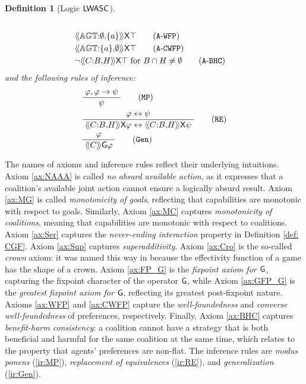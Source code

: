 \documentclass{article}
\newtheorem{definition}{Definition}
\begin{document}
\begin{definition}[Logic $\mathsf{LWASC}$]
\begin{align*}
\\
& 
\atlbh{\Agt}{\emptyset}{\{a\}}\X\top 
\tag{$\mathtt{A}\text{-}\mathtt{WFP}$}\label{ax:WFP}
\\
& 
\atlbh{\Agt}{\{a\}}{\emptyset}\X\top
\tag{$\mathtt{A}\text{-}\mathtt{CWFP}$}\label{ax:CWFP}
\\
& 
\neg \atlbh{\Coalition}{\GroupB}{\GroupH}\nexttime \top\text{ for }\GroupB\cap \GroupH\neq \emptyset
\tag{$\mathtt{A}\text{-}\mathtt{BHC}$} \label{ax:BHC} 
\end{align*}
and the following rules of inference:
\begin{align}
& \dfrac{\;\phi, \phi \rightarrow \psi \;}
{\;\psi \;} \tag{$\mathtt{MP}$} \label{ir:MP}
\\
& \dfrac{\; \phi \iff \psi \;}{\; \atlbh{\Coalition}{\GroupB}{\GroupH}\nexttime \phi \iff \atlbh{\Coalition}{\GroupB}{\GroupH}\nexttime \psi\;} 
  \tag{$\mathtt{RE}$} \label{ir:RE}
  \\
& \dfrac{\; \phi \;}{\; \atlop{\Coalition}\G \phi \;} 
  \tag{$\mathtt{Gen}$} \label{ir:Gen}
\end{align}
\end{definition}


The names of axioms and inference rules reflect their underlying intuitions. 
Axiom \ref{ax:NAAA} is called \emph{no absurd available action}, as it expresses that a coalition's available joint action cannot ensure a logically absurd result. 
Axiom \ref{ax:MG} is called \emph{monotonicity of goals}, reflecting that capabilities are monotonic with respect to goals. 
Similarly, Axiom \ref{ax:MC} captures \emph{monotonicity of coalitions}, meaning that capabilities are monotonic with respect to coalitions. 
Axiom \ref{ax:Ser} captures the  \emph{never-ending interaction} property in Definition \ref{def: CGF}. 
Axiom \ref{ax:Sup} captures \emph{superadditivity}. 
Axiom \ref{ax:Cro} is the so-called \emph{crown} axiom: it was named this way in \cite{goranko_strategic_2013} because the effectivity function of a game has the shape of a crown. 
Axiom \ref{ax:FP_G} is the \emph{fixpoint axiom for $\mathsf{G}$}, capturing the fixpoint character of the operator $\mathsf{G}$, while Axiom \ref{ax:GFP_G} is the \emph{greatest fixpoint axiom for $\mathsf{G}$}, reflecting its greatest post-fixpoint nature. 
Axioms \ref{ax:WFP} and \ref{ax:CWFP} capture the \emph{well-foundedness} and \emph{converse well-foundedness} of preferences, respectively. 
Finally, Axiom \ref{ax:BHC} captures \emph{benefit-harm consistency}: a coalition cannot have a strategy that is both beneficial and harmful for the same coalition at the same time, which relates to the property that agents' preferences are non-flat. 
The inference rules are \emph{modus ponens} (\ref{ir:MP}), \emph{replacement of equivalences} (\ref{ir:RE}), and \emph{generalization} (\ref{ir:Gen}).
\end{document}
